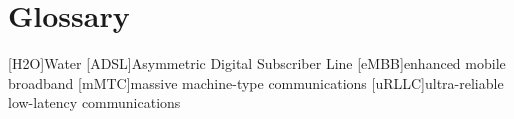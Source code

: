 \chapter{Glossary}

\footnotesize
\SingleSpacing

\begin{multicols}{2}
\begin{acronym}[AAAAAA]

	[H2O]{Water}
	[ADSL]{Asymmetric Digital Subscriber Line}
	[eMBB]{enhanced mobile broadband}
	[mMTC]{massive machine-type communications}
	[uRLLC]{ultra-reliable low-latency communications}

\end{acronym}
\end{multicols}

